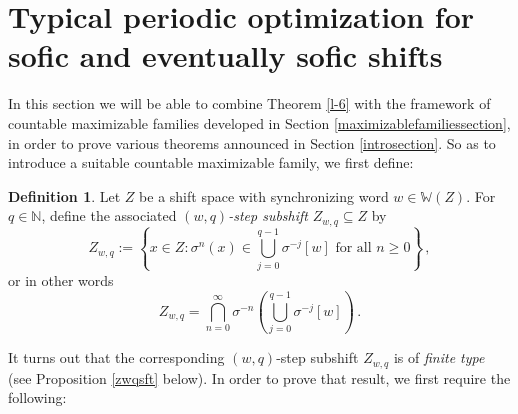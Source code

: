 \documentclass[reqno,11pt]{amsart}
\theoremstyle{definition}
\newtheorem{defn}[thm]{Definition}
\theoremstyle{remark}
\theoremstyle{remark}
\def \N {\mathbb N}
\def\w{\mathbb{W}}
\numberwithin{equation}{section}
\begin{document}
\section{ Typical periodic optimization for sofic and eventually sofic shifts}\label{SFTmaximizablefamily}



In this section we will be able to combine 
Theorem \ref{l-6} with the framework of countable
maximizable families developed in Section \ref{maximizablefamiliessection},
in order to prove various theorems announced in Section \ref{introsection}.
So as to introduce a suitable countable maximizable family, we first define:

\begin{defn}
Let $Z$ be a shift space with synchronizing word $w\in\w(Z)$.
For $q\in\N$, define the associated \emph{$(w,q)$-step subshift} $Z_{w,q}\subseteq Z$ by
\begin{equation}\label{zwq}
Z_{w,q}:=\left\{ x\in Z: \sigma^n(x)\in \bigcup_{j=0}^{q-1} \sigma^{-j}[w]\text{ for all }n\ge0\right\}\,,
\end{equation}
or in other words
$$
Z_{w,q}=
\bigcap_{n=0}^\infty \sigma^{-n}\left( \bigcup_{j=0}^{q-1} \sigma^{-j}[w] \right)
\,.
$$
\end{defn}



It turns out that the corresponding $(w,q)$-step subshift $Z_{w,q}$ is of
\emph{finite type} (see Proposition \ref{zwqsft} below).
In order to prove that result, we first require the following:
\end{document}
